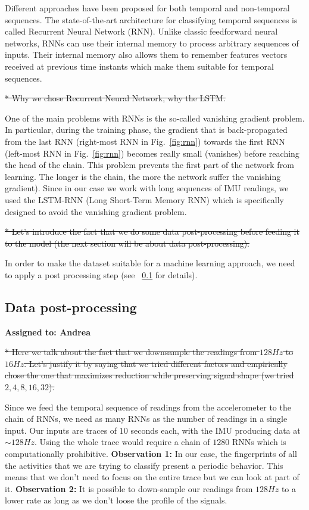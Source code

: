 \documentclass{article}
\begin{document}
Different approaches have been proposed for both temporal and non-temporal sequences.
The state-of-the-art architecture for classifying temporal sequences is called Recurrent Neural
Network (RNN). Unlike classic feedforward neural networks, RNNs can use their internal memory 
to process arbitrary sequences of inputs. Their internal memory also allows them to remember
features vectors received at previous time instants which make them suitable for temporal
sequences. 

\st{* Why we chose Recurrent Neural Network, why the LSTM.}

One of the main problems with RNNs is the so-called vanishing gradient problem. In particular,
during the training phase, the gradient that is back-propagated from the last RNN (right-most 
RNN in Fig.~\ref{fig:rnn}) towards the first RNN (left-most RNN in Fig.~\ref{fig:rnn}) becomes
really small (vanishes) before reaching the head of the chain. This problem prevents the first
part of the network from learning. The longer is the chain, the more the network suffer
the vanishing gradient). Since in our case we work with long sequences of IMU readings, we used
the LSTM-RNN (Long Short-Term Memory RNN) which is specifically designed to avoid the 
vanishing gradient problem.

\st{* Let's introduce the fact that we do some data post-processing before feeding it to the model
(the next section will be about data post-processing).}

In order to make the dataset suitable for a machine learning approach, we need to apply
a post processing step (see ~\ref{subs:postproc} for details).

\newpage
\subsection{Data post-processing}\label{subs:postproc}
\vspace{-.3cm}
\textbf{Assigned to: Andrea}

\st{* Here we talk about the fact that we downsample the readings from $128Hz$ to $16Hz$. Let's
justify it by saying that we tried different factors and empirically chose the one that maximizes
reduction while preserving signal shape (we tried $2, 4, 8, 16, 32$).}

Since we feed the temporal sequence of readings from the accelerometer to the chain of RNNs,
we need as many RNNs as the number of readings in a single input. Our inputs are traces of
$10$ seconds each, with the IMU producing data at $\sim 128Hz$. Using the whole trace would
require a chain of $1280$ RNNs which is computationally prohibitive. 
\textbf{Observation 1:} In our
case, the fingerprints of all the activities that we are trying to classify present a periodic behavior.
This means that we don't need to focus on the entire trace but we can look at part of it. 
\textbf{Observation 2:} It is possible to down-sample our readings from $128Hz$ to a lower
rate as long as we don't loose the profile of the signals.
\end{document}
